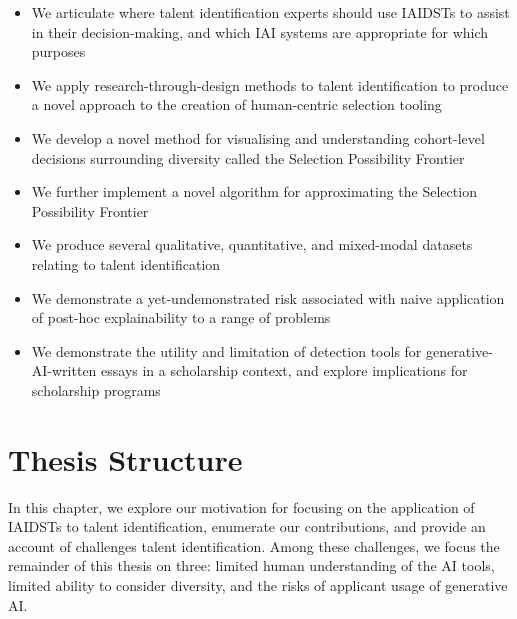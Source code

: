 \begin{itemize}
    \item We articulate where talent identification experts should use IAIDSTs to assist in their decision-making, and which IAI systems are appropriate for which purposes
    \item We apply research-through-design methods to talent identification to produce a novel approach to the creation of human-centric selection tooling
    \item We develop a novel method for visualising and understanding cohort-level decisions surrounding diversity called the Selection Possibility Frontier
    \item We further implement a novel algorithm for approximating the Selection Possibility Frontier
    \item We produce several qualitative, quantitative, and mixed-modal datasets relating to talent identification
    \item We demonstrate a yet-undemonstrated risk associated with naive application of post-hoc explainability to a range of problems
    \item We demonstrate the utility and limitation of detection tools for generative-AI-written essays in a scholarship context, and explore implications for scholarship programs
\end{itemize}

\section{Thesis Structure}
In this chapter, we explore our motivation for focusing on the application of IAIDSTs to talent identification, enumerate our contributions, and provide an account of challenges talent identification. Among these challenges, we focus the remainder of this thesis on three: limited human understanding of the AI tools, limited ability to consider diversity, and the risks of applicant usage of generative AI.

